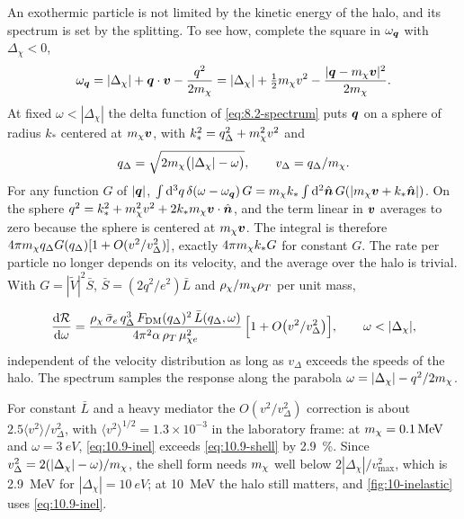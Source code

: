 An exothermic particle is not limited by the kinetic energy of the halo, and its spectrum is set by the splitting. To see how, complete the square in $\omega_{\bm{q}}$ with $\Delta_\chi < 0$,
\begin{equation*}
  \omega_{\bm{q}} = |\Delta_\chi| + \bm{q}\cdot\bm{v} - \frac{q^2}{2m_{\chi}} = |\Delta_\chi| + \tfrac12m_{\chi} v^2 - \frac{|\bm{q} - m_{\chi}\bm{v}|^2}{2m_{\chi}} .
\end{equation*}
At fixed $\omega < |\Delta_\chi|$ the delta function of \cref{eq:8.2-spectrum} puts $\bm{q}$ on a sphere of radius $k_*$ centered at $m_{\chi}\bm{v}$, with $k_*^2 = q_\Delta^2 + m_{\chi}^2v^2$ and
\begin{equation*}
  q_\Delta = \sqrt{2m_{\chi}\bigl(|\Delta_\chi| - \omega\bigr)} , \qquad v_\Delta = q_\Delta/m_{\chi} .
\end{equation*}
For any function $G$ of $|\bm{q}|$, $\int\mathrm{d}^3q\,\delta(\omega - \omega_{\bm{q}})\,G = m_{\chi} k_*\int\mathrm{d}^2\hat{\bm{n}}\,G(|m_{\chi}\bm{v} + k_*\hat{\bm{n}}|)$. On the sphere $q^2 = k_*^2 + m_{\chi}^2v^2 + 2k_*m_{\chi}\bm{v}\cdot\hat{\bm{n}}$, and the term linear in $\bm{v}$ averages to zero because the sphere is centered at $m_{\chi}\bm{v}$. The integral is therefore $4\pi m_{\chi} q_\Delta G(q_\Delta)[1 + O(v^2/v_\Delta^2)]$, exactly $4\pi m_{\chi} k_*G$ for constant $G$. The rate per particle no longer depends on its velocity, and the average over the halo is trivial. With $G = |\tilde V|^2\bar S$, $\bar S = (2q^2/e^2)\bar L$ and $\rho_\chi/m_{\chi}\rho_T$ per unit mass,
\begin{keyresult}
\begin{equation}
  \frac{\mathrm{d}\mathcal{R}}{\mathrm{d}\omega} = \frac{\rho_\chi\,\bar{\sigma}_{e}\,q_\Delta^3\,F_{\mathrm{DM}}(q_\Delta)^2\,\bar L(q_\Delta,\omega)}{4\pi^2\alpha\,\rho_T\,\mu_{\chi e}^2}\,\Bigl[1 + O\bigl(v^2/v_\Delta^2\bigr)\Bigr] , \qquad \omega < |\Delta_\chi| ,
  \label{eq:10.9-shell}
\end{equation}
independent of the velocity distribution as long as $v_\Delta$ exceeds the speeds of the halo. The spectrum samples the response along the parabola $\omega = |\Delta_\chi| - q^2/2m_{\chi}$.
\end{keyresult}
\noindent For constant $\bar L$ and a heavy mediator the $O(v^2/v_\Delta^2)$ correction is about $2.5\langle v^2\rangle/v_\Delta^2$, with $\langle v^2\rangle^{1/2} = 1.3\times10^{-3}$ in the laboratory frame: at $m_{\chi} = \SI{0.1}{MeV}$ and $\omega = \SI{3}{eV}$, \cref{eq:10.9-inel} exceeds \cref{eq:10.9-shell} by \SI{2.9}{\percent}. Since $v_\Delta^2 = 2(|\Delta_\chi| - \omega)/m_{\chi}$, the shell form needs $m_{\chi}$ well below $2|\Delta_\chi|/v_{\mathrm{max}}^2$, which is \SI{2.9}{MeV} for $|\Delta_\chi| = \SI{10}{eV}$; at \SI{10}{MeV} the halo still matters, and \cref{fig:10-inelastic} uses \cref{eq:10.9-inel}.

